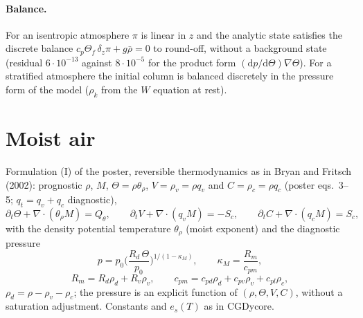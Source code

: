 \documentclass[11pt,a4paper]{article}
\begin{document}
\paragraph{Balance.} For an isentropic atmosphere $\pi$ is linear in $z$ and the analytic state satisfies
the discrete balance $c_p\Theta_f\,\delta_z\pi+g\bar\rho=0$ to round-off, without a background state
(residual $6\cdot10^{-13}$ against $8\cdot10^{-5}$ for the product form $(\mathrm dp/\mathrm d\Theta)\nabla\Theta$).
For a stratified atmosphere the initial column is balanced discretely in the pressure form of the
model ($\rho_k$ from the $W$ equation at rest).

\section{Moist air}
Formulation (I) of the poster, reversible thermodynamics as in Bryan and Fritsch (2002):
prognostic $\rho$, $M$, $\Theta=\rho\theta_\rho$, $V=\rho_v=\rho q_v$ and $C=\rho_c=\rho q_c$ (poster
eqs.~3--5; $q_t=q_v+q_c$ diagnostic),
\[
\partial_t\Theta+\nabla\cdot(\theta_\rho M)=Q_\theta,\qquad\partial_tV+\nabla\cdot(q_vM)=-S_c,\qquad
\partial_tC+\nabla\cdot(q_cM)=S_c,
\]
with the density potential temperature
$\theta_\rho$ (moist exponent) and the diagnostic pressure
\[
p=p_0\Big(\frac{R_d\,\Theta}{p_0}\Big)^{1/(1-\kappa_M)},\qquad \kappa_M=\frac{R_m}{c_{pm}},
\]
\[
R_m=R_d\rho_d+R_v\rho_v,\qquad c_{pm}=c_{pd}\rho_d+c_{pv}\rho_v+c_{pl}\rho_c,
\]
$\rho_d=\rho-\rho_v-\rho_c$; the pressure is an explicit function of $(\rho,\Theta,V,C)$, without a saturation
adjustment. Constants and $e_s(T)$ as in CGDycore.
\end{document}
